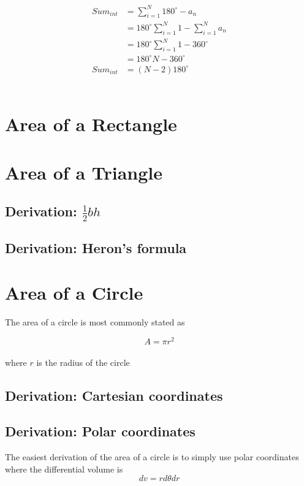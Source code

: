 \documentclass[11pt]{book}
\begin{document}
\begin{align*}
Sum_{int} &= \sum\limits_{i=1}^N{180^{\circ}-a_n}\\
&= 180^{\circ}\sum\limits_{i=1}^N{1}-\sum\limits_{i=1}^N{a_n}\\
&= 180^{\circ}\sum\limits_{i=1}^N{1}-360^{\circ}\\
&= 180^{\circ}N-360^{\circ}\\
Sum_{int} &= (N-2)180^{\circ}
\end{align*}
\\

\section{Area of a Rectangle}

\section{Area of a Triangle}

\subsection{Derivation: $\frac{1}{2}bh$}

\subsection{Derivation: Heron's formula}

\section{Area of a Circle}

The area of a circle is most commonly stated as

\[A = \pi r^2\]
\\
where \(r\) is the radius of the circle

\subsection{Derivation: Cartesian coordinates}

\subsection{Derivation: Polar coordinates}
The easiest derivation of the area of a circle is to simply use polar coordinates where the differential volume is 
\[dv = rd\theta dr\]
\end{document}
